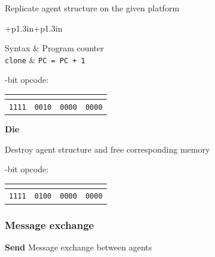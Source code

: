 \documentclass{scrreprt}
\begin{document}
\noindent
Replicate agent structure on the given platform

\noindent
{}
\vspace{0.1in}

\begin{tabular}{+p{1.3in}+p{1.3in}}

Syntax    & Program counter \\

\texttt{clone}  & \texttt{PC = PC + 1} \\

\end{tabular}

\vspace{0.1in}
-bit opcode:

\noindent
\begin{tabular}{|c|c|c|c|}
  \multicolumn{4}{|c|}{}\\
\hline
\texttt{1111} & \texttt{0010} & \texttt{0000} & \texttt{0000}\\

\end{tabular}

\vspace{0.4in}
\noindent
\textbf{Die}

\noindent
Destroy agent structure and free corresponding memory

\noindent
{}

\vspace{0.1in}
-bit opcode:

\noindent
\begin{tabular}{|c|c|c|c|}
  \multicolumn{4}{|c|}{}\\
\hline
\texttt{1111} & \texttt{0100} & \texttt{0000} & \texttt{0000}\\
\end{tabular}

\subsubsection{Message exchange}
\noindent
\textbf{Send}
Message exchange between agents
\noindent


\noindent
{}
\vspace{0.1in}
\end{document}
